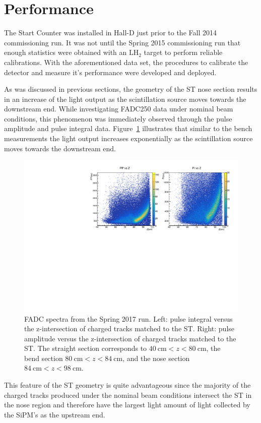 \section{Performance} \label{sec:perform}

The Start Counter was installed in Hall-D just prior to the Fall 2014 \gx{} commissioning run.  It was not until the Spring 2015 commissioning run that enough statistics were obtained with an $\mathrm{LH_{2}}$ target to perform reliable calibrations.  With the aforementioned data set, the procedures to calibrate the detector and measure it's performance were developed and deployed.

As was discussed in previous sections, the geometry of the ST nose section results in an increase of the light output as the scintillation source moves towards the downstream end.  While investigating FADC250 data under nominal beam conditions, this phenomenon was immediately observed through the pulse amplitude and pulse integral data. Figure~\ref{fig:pippvszint} illustrates that similar to the bench measurements the light output increases exponentially as the scintillation source moves towards the downstream end.
	\begin{figure}[!htb]
		\centering
		\includegraphics[width=1.0\columnwidth]{performance/figs/PP_Z}
		\caption{FADC spectra from the Spring 2017 run. Left: pulse integral versus the z-intersection of charged tracks matched to the ST. Right: pulse amplitude versus the z-intersection of charged tracks matched to the ST. The straight section corresponds to $40\ \mathrm{cm} < z < 80\ \mathrm{cm}$, the bend section $80\ \mathrm{cm} < z < 84\ \mathrm{cm}$, and the nose section $84\ \mathrm{cm} < z < 98\ \mathrm{cm}$.}
		\label{fig:pippvszint}
	\end{figure}
This feature of the ST geometry is quite advantageous since the majority of the charged tracks produced under the nominal \gx{} beam conditions intersect the ST in the nose region and therefore have the largest light amount of light collected by the SiPM's as the upstream end.

